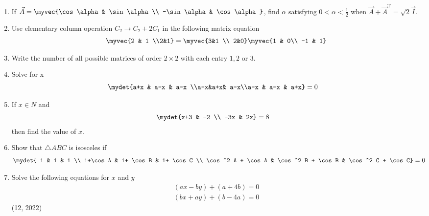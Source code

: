 \begin{enumerate}[label=\thesubsection.\arabic*, ref=\thesubsection.\theenumi]
    \item If $\vec{A} = \myvec{\cos \alpha & \sin \alpha\\ -\sin \alpha & \cos \alpha}$, find $\alpha$ satisfying $0<\alpha<\frac{1}{2}$ when $\vec{A} + \vec{A}^{\text{T}} = \sqrt{2}\vec{I}$.
    \item Use elementary column operation $C_2 \rightarrow C_2 + 2C_1$ in the following matrix equation
          \begin{align*}
              \myvec{2 & 1 \\2&1} = \myvec{3&1 \\ 2&0} \myvec{1 & 0\\ -1 & 1}
          \end{align*}
    \item Write the number of all possible matrices of order $2\times2$ with each entry $1,2$ or $3$.
    \item Solve for x
          \begin{align*}
              \mydet{a+x & a-x & a-x \\a-x&a+x& a-x\\a-x & a-x & a+x} &=0
          \end{align*}
    \item If $x \in N$ and
          \begin{align*}
              \mydet{x+3 & -2 \\ -3x & 2x} &= 8
          \end{align*}
          then find the value of $x$.
    \item Show that $\triangle ABC$ is isosceles if 
          \begin{align*}
              \mydet{
              1                 & 1                 & 1                       \\
              1+\cos A          & 1+ \cos B         & 1+ \cos C               \\
              \cos^2 A + \cos A & \cos^2 B + \cos B & \cos^2 C + \cos C} & =0
          \end{align*}
\item Solve the following equations for $x$ and $y$ 
	\begin{align*}
		(ax-by)+(a+4b)=0\\
		(bx+ay)+(b-4a)=0
	\end{align*}
\hfill (12, 2022)
\end{enumerate}
